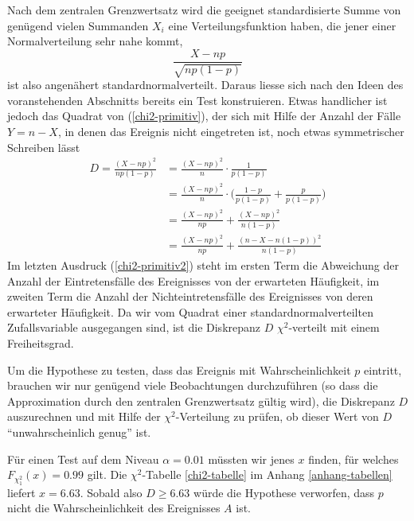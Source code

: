 Nach dem zentralen Grenzwertsatz wird die geeignet standardisierte Summe
von genügend vielen Summanden $X_i$ eine Verteilungsfunktion haben,
die jener einer Normalverteilung sehr nahe kommt, 
\begin{equation}
\frac{X-np}{\sqrt{np(1-p)}}
\label{chi2-primitiv}
\end{equation}
ist also angenähert standardnormalverteilt.
Daraus liesse sich nach den
Ideen des voranstehenden Abschnitts bereits ein Test konstruieren.
Etwas handlicher ist jedoch das Quadrat von (\ref{chi2-primitiv}), der
sich mit Hilfe der Anzahl der Fälle $Y=n-X$, in denen das Ereignis
nicht eingetreten ist, noch etwas symmetrischer Schreiben lässt
\begin{align}
D=\frac{(X-np)^2}{np(1-p)}
&=
\frac{(X-np)^2}{n}\cdot \frac{1}{p(1-p)}\nonumber
\\
&=
\frac{(X-np)^2}{n}\cdot
\biggl(
\frac{1-p}{p(1-p)} +
\frac{p}{p(1-p)}
\biggr)\nonumber
\\
&=
\frac{(X-np)^2}{np}+\frac{(X-np)^2}{n(1-p)}\nonumber
\\
&=
\frac{(X-np)^2}{np}+\frac{(n-X-n(1-p))^2}{n(1-p)}\label{chi2-primitiv2}
\end{align}
Im letzten Ausdruck (\ref{chi2-primitiv2})
steht im ersten Term die Abweichung der
Anzahl der Eintretensfälle des Ereignisses von der erwarteten Häufigkeit,
im zweiten Term die Anzahl der Nichteintretensfälle des Ereignisses
von deren erwarteter Häufigkeit.
Da wir vom Quadrat einer standardnormalverteilten Zufallsvariable ausgegangen
sind, ist die Diskrepanz $D$ $\chi^2$-verteilt mit einem Freiheitsgrad.

Um die Hypothese zu testen, dass das Ereignis mit Wahrscheinlichkeit $p$
eintritt, brauchen wir nur genügend viele Beobachtungen durchzuführen
(so dass die Approximation durch den zentralen Grenzwertsatz gültig wird),
die Diskrepanz $D$ auszurechnen und mit Hilfe der $\chi^2$-Verteilung
zu prüfen, ob dieser Wert von $D$ ``unwahrscheinlich genug'' ist.

Für einen Test auf dem Niveau $\alpha=0.01$ müssten wir jenes
$x$ finden, für welches $F_{\chi^2_1}(x)=0.99$ gilt.
Die $\chi^2$-Tabelle \ref{chi2-tabelle} im Anhang \ref{anhang-tabellen}
liefert $x=6.63$.
Sobald also $D\ge 6.63$ würde die Hypothese verworfen,
dass $p$ nicht die Wahrscheinlichkeit des Ereignisses $A$ ist.

